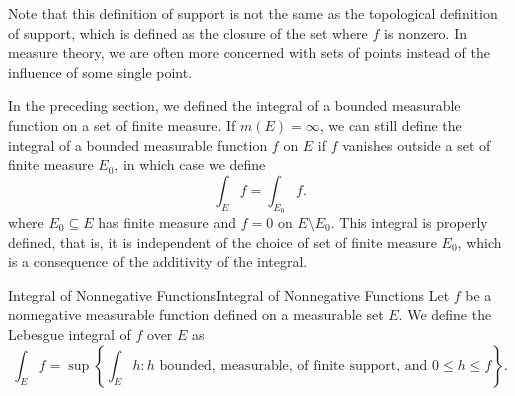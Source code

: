 \documentclass[../main.tex]{subfiles}
\begin{document}
\begin{remark}
	Note that this definition of support is not the same as the topological definition of support, which is defined as the closure of the set where $f$ is nonzero. In measure theory, we are often more concerned with sets of points instead of the influence of some single point.
\end{remark}

In the preceding section, we defined the integral of a bounded measurable function on a set of finite measure. If $m(E) = \infty$, we can still define the integral of a bounded measurable function $f$ on $E$ if $f$ vanishes outside a set of finite measure $E_0$, in which case we define
\begin{equation}
	\int_E f = \int_{E_0} f.
\end{equation}
where $E_0 \subseteq E$ has finite measure and $f = 0$ on $E \setminus E_0$. This integral is properly defined, that is, it is independent of the choice of set of finite measure $E_0$, which is a consequence of the additivity of the integral.

\begin{definition}{Integral of Nonnegative Functions}{Integral of Nonnegative Functions}
	Let $f$ be a nonnegative measurable function defined on a measurable set $E$. We define the Lebesgue integral of $f$ over $E$ as
	\begin{equation}
		\int_E f = \sup \left\{ \int_E h: h \text{ bounded, measurable, of finite support, and } 0 \leq h \leq f \right\}.
	\end{equation}
\end{definition}
\end{document}
